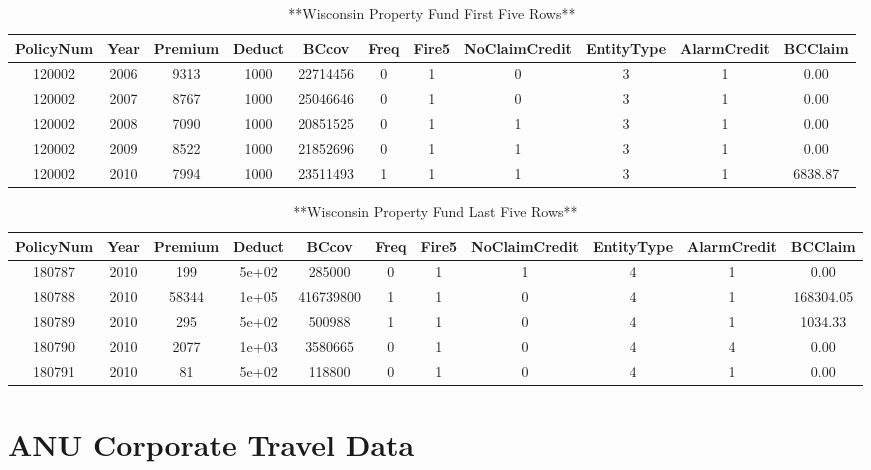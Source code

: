 \documentclass[
]{book}
\begin{document}
\begin{table}

\caption{\label{tab:unnamed-chunk-28}**Wisconsin Property Fund First Five Rows**}
\centering
\begin{tabular}[t]{c|c|c|c|c|c|c|c|c|c|c}
\hline
PolicyNum & Year & Premium & Deduct & BCcov & Freq & Fire5 & NoClaimCredit & EntityType & AlarmCredit & BCClaim\\
\hline
120002 & 2006 & 9313 & 1000 & 22714456 & 0 & 1 & 0 & 3 & 1 & 0.00\\
\hline
120002 & 2007 & 8767 & 1000 & 25046646 & 0 & 1 & 0 & 3 & 1 & 0.00\\
\hline
120002 & 2008 & 7090 & 1000 & 20851525 & 0 & 1 & 1 & 3 & 1 & 0.00\\
\hline
120002 & 2009 & 8522 & 1000 & 21852696 & 0 & 1 & 1 & 3 & 1 & 0.00\\
\hline
120002 & 2010 & 7994 & 1000 & 23511493 & 1 & 1 & 1 & 3 & 1 & 6838.87\\
\hline
\end{tabular}
\end{table}

\begin{table}

\caption{\label{tab:unnamed-chunk-28}**Wisconsin Property Fund Last Five Rows**}
\centering
\begin{tabular}[t]{c|c|c|c|c|c|c|c|c|c|c}
\hline
PolicyNum & Year & Premium & Deduct & BCcov & Freq & Fire5 & NoClaimCredit & EntityType & AlarmCredit & BCClaim\\
\hline
180787 & 2010 & 199 & 5e+02 & 285000 & 0 & 1 & 1 & 4 & 1 & 0.00\\
\hline
180788 & 2010 & 58344 & 1e+05 & 416739800 & 1 & 1 & 0 & 4 & 1 & 168304.05\\
\hline
180789 & 2010 & 295 & 5e+02 & 500988 & 1 & 1 & 0 & 4 & 1 & 1034.33\\
\hline
180790 & 2010 & 2077 & 1e+03 & 3580665 & 0 & 1 & 0 & 4 & 4 & 0.00\\
\hline
180791 & 2010 & 81 & 5e+02 & 118800 & 0 & 1 & 0 & 4 & 1 & 0.00\\
\hline
\end{tabular}
\end{table}

\hypertarget{Sec:DataTravel}{%
\section{ANU Corporate Travel Data}\label{Sec:DataTravel}}
\end{document}

